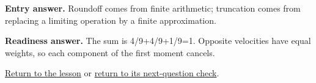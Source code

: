 \label{solution:entry:fluids}

\textbf{Entry answer.} Roundoff comes from finite arithmetic; truncation comes from replacing a limiting operation by a finite approximation.\par

\label{solution:ready:fluids}

\textbf{Readiness answer.} The sum is 4/9+4/9+1/9=1. Opposite velocities have equal weights, so each component of the first moment cancels.\par

\hyperref[learn:fluids]{Return to the lesson} or \hyperref[readiness:fluids]{return to its next-question check}.
